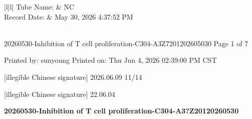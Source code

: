 \documentclass[UTF8,10pt,a4paper,fontset=fandol]{ctexart}
\newcommand{\handwritten}[1]{#1}
\begin{document}
\vspace{0.6em}

\begin{center}
\begin{tabular}{|l|l|}
\hline
Tube Name: & NC\\
Record Date: & May 30, 2026 4:37:52 PM\\
\hline
{}\\
\hline
\end{tabular}
\end{center}

\vfill

\noindent
\scriptsize 20260530-Inhibition of T cell proliferation-C304-A3Z7201202605030
\hfill Page 1 of 7

\noindent
\scriptsize Printed by: sunyoung
\hfill Printed on: Thu Jun 4, 2026 02:39:00 PM CST

\vspace{1em}

\begin{flushright}
\handwritten{[illegible Chinese signature]}
\quad
\handwritten{2026.06.09}
\quad
\handwritten{11/14}

\vspace{0.8em}

\handwritten{[illegible Chinese signature]}
\quad
\handwritten{22.06.04}
\end{flushright}

\newpage

\begin{center}
\textbf{20260530-Inhibition of T cell proliferation-C304-A3?Z20120260530}
\end{center}
\end{document}
